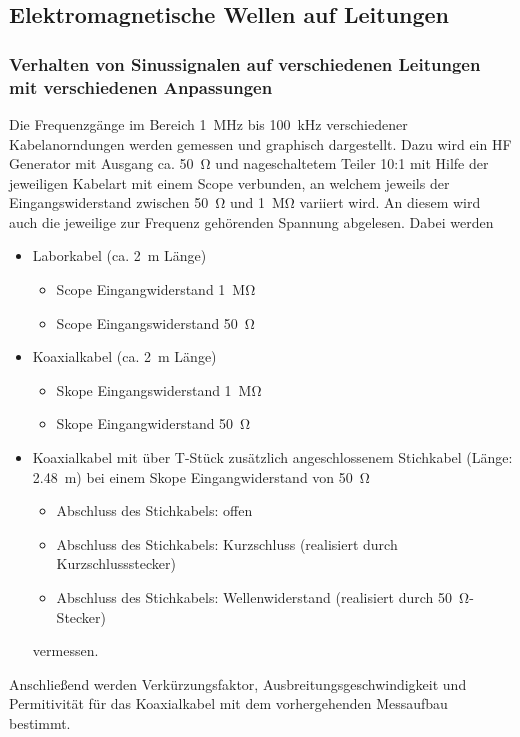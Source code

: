 \documentclass[a4paper,twoside,final]{article}
\begin{document}
\subsection{Elektromagnetische Wellen auf Leitungen}
\subsubsection{Verhalten von Sinussignalen auf verschiedenen Leitungen mit verschiedenen Anpassungen}
Die Frequenzgänge im Bereich \SI{1}{\mega\hertz} bis \SI{100}{\kilo\hertz} verschiedener Kabelanorndungen werden gemessen und graphisch dargestellt. Dazu wird ein HF Generator mit Ausgang ca. \SI{50}{\ohm} und nageschaltetem Teiler 10:1 mit Hilfe der jeweiligen Kabelart mit einem Scope verbunden, an welchem jeweils der Eingangswiderstand zwischen \SI{50}{\ohm}  und \SI{1}{\mega\ohm} variiert wird. An diesem wird auch die jeweilige zur Frequenz gehörenden Spannung abgelesen.  Dabei werden
\begin{itemize}
  \item Laborkabel (ca. \SI{2}{\meter} Länge)
  \begin{itemize}
    \item Scope Eingangwiderstand \SI{1}{\mega\ohm}
    \item Scope Eingangswiderstand \SI{50}{\ohm}
  \end{itemize}
  \item{Koaxialkabel (ca. \SI{2}{\meter} Länge)}
  \begin{itemize}
    \item Skope Eingangswiderstand \SI{1}{\mega\ohm}
    \item Skope Eingangwiderstand \SI{50}{\ohm}
  \end{itemize}
  \item Koaxialkabel mit über T-Stück zusätzlich angeschlossenem Stichkabel (Länge: \SI{2,48}{\meter}) bei einem Skope Eingangwiderstand von \SI{50}{\ohm}
  \begin{itemize}
    \item Abschluss des Stichkabels: offen
    \item Abschluss des Stichkabels: Kurzschluss (realisiert durch Kurzschlussstecker)
    \item Abschluss des Stichkabels: Wellenwiderstand (realisiert durch \SI{50}{\ohm}- Stecker)
  \end{itemize}
  vermessen.
\end{itemize}

Anschließend werden Verkürzungsfaktor, Ausbreitungsgeschwindigkeit und Permitivität für das Koaxialkabel mit dem vorhergehenden Messaufbau bestimmt.
\end{document}
